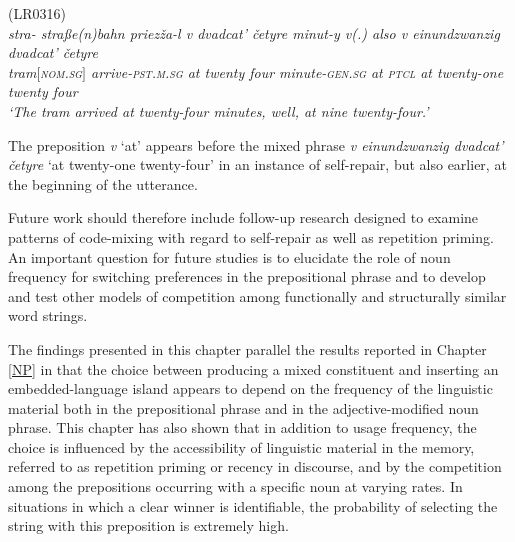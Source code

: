 \ea
\label{ex:5:17}
(LR0316)\\
\gll \itshape{stra-} \itshape{stra{ß}e(n)bahn} {priezža-l} {v} {dvadcat'} {četyre} {minut-y} {v(.)} \textit{also} {v} \textit{einundzwanzig} {dvadcat'} {četyre}\\
	{} {tram$[$\textsc{nom.sg}$]$} arrive-\textsc{pst.m.sg} at twenty four minute-\textsc{gen.sg} at \textsc{ptcl} at twenty-one twenty four\\
\glt `The tram arrived at twenty-four minutes, well, at nine twenty-four.'
\z

\noindent The preposition \textit{v} `at' appears before the mixed phrase \textit{v einundzwanzig dvadcat' četyre} `at twenty-one twenty-four' in an instance of self-repair, but also earlier, at the beginning of the utterance. 

Future work should therefore include follow-up research designed to examine patterns of code-mixing with regard to self-repair as well as repetition priming. An important question for future studies is to elucidate the role of noun frequency for switching preferences in the prepositional phrase and to develop and test other models of competition among functionally and structurally similar word strings. 

The findings presented in this chapter parallel the results reported in Chapter \ref{NP} in that the choice between producing a mixed constituent and inserting an embedded-language island appears to depend on the frequency of the linguistic material both in the prepositional phrase and in the adjective-modified noun phrase. This chapter has also shown that in addition to usage frequency, the choice is influenced by the accessibility of linguistic material in the memory, referred to as repetition priming or recency in discourse, and by the competition among the prepositions occurring with a specific noun at varying rates. In situations in which a clear winner is identifiable, the probability of selecting the string with this preposition is extremely high. 

